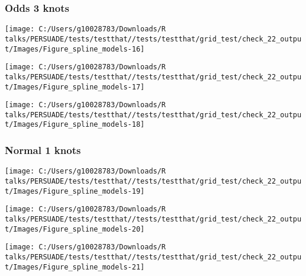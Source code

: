 \documentclass[
]{article}
\begin{document}
\clearpage

\subsubsection{Odds 3 knots}\label{odds-3-knots}

\begin{flushleft}\texttt{[image: C:/Users/g10028783/Downloads/R talks/PERSUADE/tests/testthat//tests/testthat/grid\_test/check\_22\_output/Images/Figure\_spline\_models-16]} \end{flushleft}

\begin{flushleft}\texttt{[image: C:/Users/g10028783/Downloads/R talks/PERSUADE/tests/testthat//tests/testthat/grid\_test/check\_22\_output/Images/Figure\_spline\_models-17]} \end{flushleft}

\begin{flushleft}\texttt{[image: C:/Users/g10028783/Downloads/R talks/PERSUADE/tests/testthat//tests/testthat/grid\_test/check\_22\_output/Images/Figure\_spline\_models-18]} \end{flushleft}

\clearpage

\subsubsection{Normal 1 knots}\label{normal-1-knots}

\begin{flushleft}\texttt{[image: C:/Users/g10028783/Downloads/R talks/PERSUADE/tests/testthat//tests/testthat/grid\_test/check\_22\_output/Images/Figure\_spline\_models-19]} \end{flushleft}

\begin{flushleft}\texttt{[image: C:/Users/g10028783/Downloads/R talks/PERSUADE/tests/testthat//tests/testthat/grid\_test/check\_22\_output/Images/Figure\_spline\_models-20]} \end{flushleft}

\begin{flushleft}\texttt{[image: C:/Users/g10028783/Downloads/R talks/PERSUADE/tests/testthat//tests/testthat/grid\_test/check\_22\_output/Images/Figure\_spline\_models-21]} \end{flushleft}

\clearpage
\end{document}

